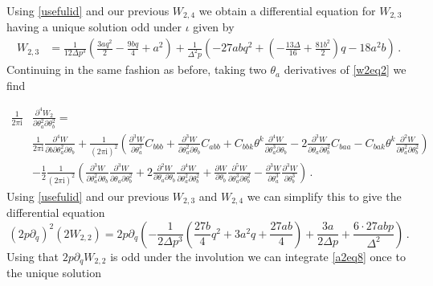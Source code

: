 \documentclass{article}
\theoremstyle{definition}
\numberwithin{equation}{section}
\begin{document}
Using \eqref{usefulid} and our previous $W_{2,4}$ we obtain a differential equation for $W_{2,3}$ having a unique solution odd under $\iota$ given by 
\begin{equation*}
\begin{split}
    W_{2,3}&=\frac{1}{12\Delta p^3}\left(\frac{3aq^2}{2}-\frac{9bq}{4}+a^2\right)+\frac{1}{\Delta^2p}\left(-27abq^2+\left(-\frac{13\Delta}{16}+\frac{81b^2}{2}\right)q-18a^2b\right)\,.
\end{split}
\end{equation*}
Continuing in the same fashion as before, taking two $\theta_a$ derivatives of \eqref{w2eq2} we find 

\begin{equation}\label{w2eq7}
    \begin{split}
        \frac{1}{2\pi \mathrm{i}}&\frac{\partial^4 W_2}{\partial \theta_a^2\partial \theta_b^2}=\\
        &\frac{1}{2\pi \mathrm{i}}\frac{\partial^4 W}{\partial b \partial \theta_a^2 \partial \theta_b}+\frac{1}{(2\pi\mathrm{i})^2}\left(\frac{\partial^3W}{\partial \theta_a^3}C_{bbb}+\frac{\partial^3W}{\partial \theta_a^2\partial \theta_b}C_{abb}+C_{bbk}\theta^k\frac{\partial^4W}{\partial \theta_a^3 \partial \theta_b}-2\frac{\partial^3 W}{\partial \theta_a\partial \theta_b^2}C_{baa}-C_{bak}\theta^k\frac{\partial^2W}{\partial \theta_a^2\partial \theta_b^2}\right)\\
        &-\frac{1}{2}\frac{1}{(2\pi\mathrm{i})^2}\left(\frac{\partial^3W}{\partial \theta_a^2 \partial\theta_b}\frac{\partial^3W}{\partial \theta_a \partial\theta_b^2}+2\frac{\partial^2W}{\partial \theta_a\partial \theta_b}\frac{\partial^4W}{\partial \theta_a^2 \partial\theta_b^2}+\frac{\partial W}{\partial \theta_b}\frac{\partial^5W}{\partial \theta_a^3 \partial\theta_b^2}-\frac{\partial^3W}{\partial \theta_a^3}\frac{\partial^3W}{ \partial\theta_b^3}\right)\,.
    \end{split}
\end{equation}
Using \eqref{usefulid} and our previous $W_{2,3}$ and $W_{2,4}$ we can simplify this to give the differential equation
\begin{equation}\label{a2eq8}
    (2p\partial_q)^2(2W_{2,2})=2p\partial_q\left(-\frac{1}{2\Delta p^3}\left(\frac{27b}{4}q^2+3a^2q+\frac{27ab}{4}\right)+\frac{3a}{2\Delta p}+\frac{6\cdot 27abp}{\Delta^2}\right)\,.
\end{equation}
Using that $2p\partial_qW_{2,2}$ is odd under the involution we can integrate \eqref{a2eq8} once to the unique solution
\end{document}
